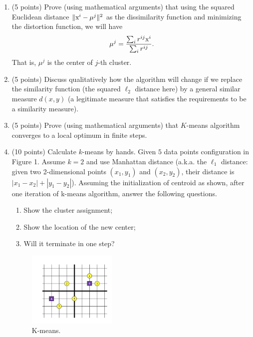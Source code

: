 \documentclass[twoside,10pt]{article}
\begin{document}
\begin{enumerate}

\item (5 points) Prove (using mathematical arguments) that using the squared Euclidean distance $\|\text x^i-\mu^j\|^2$ as the dissimilarity function and minimizing the distortion function, we will have 
   $$\mu^j=\frac{\sum_i r^{ij} \text x^i}{\sum_i r^{ij}}.$$
   That is, $\mu^j$ is the center of $j$-th cluster. 
   
   \item (5 points) Discuss qualitatively how the algorithm will change if we replace the similarity function (the squared $\ell_2$ distance here) by a general similar measure $d(x, y)$ (a legitimate measure that satisfies the requirements to be a similarity measure).
   
   
\item (5 points) Prove (using mathematical arguments) that $K$-means algorithm converges to a local optimum in finite steps. 

\item (10 points) Calculate $k$-means by hands.  Given $5$ data points configuration in Figure 1. Assume $k = 2$ and use Manhattan distance (a.k.a. the $\ell_1$ distance: given two 2-dimensional points $(x_1, y_1)$ and $(x_2, y_2)$, their distance is $|x_1 - x_2| + |y_1 - y_2|$).  Assuming the initialization of centroid as shown, after one iteration of k-means algorithm, answer the following questions. 

\begin{enumerate}
\item Show the cluster assignment;
\item Show the location of the new center;
\item Will it terminate in one step?
\end{enumerate}

\begin{figure}[h!]
\begin{center}
\includegraphics[width = 0.4\textwidth]{points.png}
\end{center}
\caption{K-means.}
\end{figure}

\end{enumerate}
\end{document}

